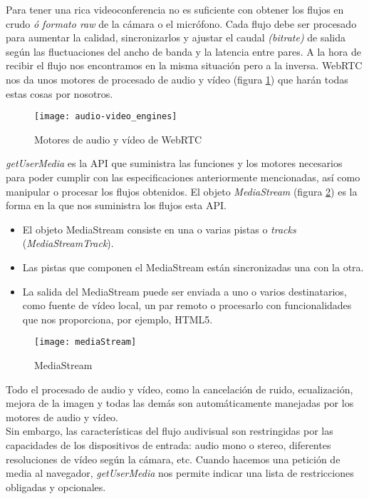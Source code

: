 Para tener una rica videoconferencia no es suficiente con obtener los flujos en crudo \textit{ó formato raw} de la cámara o el micrófono. Cada flujo debe ser procesado para aumentar la calidad, sincronizarlos y ajustar el caudal \textit{(bitrate)} de salida según las fluctuaciones del ancho de banda y la latencia entre pares. A la hora de recibir el flujo nos encontramos en la misma situación pero a la inversa. WebRTC nos da unos motores de procesado de audio y vídeo (figura \ref{fig:audio-video_engines}) que harán todas estas cosas por nosotros.\\

\begin{figure}[htb]
\centering
\texttt{[image: audio-video\_engines]}
\caption{Motores de audio y vídeo de WebRTC }
\label{fig:audio-video_engines}
\end{figure}

\emph{getUserMedia} es la API que suministra las funciones y los motores necesarios para poder cumplir con las especificaciones anteriormente mencionadas, así como manipular o procesar los flujos obtenidos. El objeto \textit{MediaStream} (figura \ref{fig:mediaStream}) es la forma en la que nos suministra los flujos esta API.\\

\begin{itemize}
\item El objeto MediaStream consiste en una o varias pistas o \textit{tracks} (\textit{MediaStreamTrack}).
\item Las pistas que componen el MediaStream están sincronizadas una con la otra.
\item La salida del MediaStream puede ser enviada a uno o varios destinatarios, como fuente de vídeo local, un par remoto o procesarlo con funcionalidades que nos proporciona, por ejemplo, HTML5.
\end{itemize}

\begin{figure}[htb]
\centering
\texttt{[image: mediaStream]}
\caption{MediaStream}
\label{fig:mediaStream}
\end{figure}

Todo el procesado de audio y vídeo, como la cancelación de ruido, ecualización, mejora de la imagen y todas las demás son automáticamente manejadas por los motores de audio y vídeo.\\

Sin embargo, las características del flujo audivisual son restringidas por las capacidades de los dispositivos de entrada: audio mono o stereo, diferentes resoluciones de vídeo según la cámara, etc. Cuando hacemos una petición de media al navegador, \emph{getUserMedia} nos permite indicar una lista de restricciones obligadas y opcionales.\\

